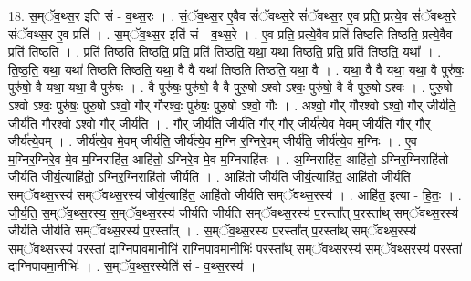 \documentclass[17pt]{extarticle}
\begin{document}
18. स॒म्ॅव॒थ्स॒र इति॑ सं - व॒थ्स॒रः । . सं॒ॅव॒थ्स॒र ए॒वैव सं॑ॅवथ्स॒रे सं॑ॅवथ्स॒र ए॒व प्रति॒ प्रत्ये॒व सं॑ॅवथ्स॒रे सं॑ॅवथ्स॒र ए॒व प्रति॑ । . स॒म्ॅव॒थ्स॒र इति॑ सं - व॒थ्स॒रे । . ए॒व प्रति॒ प्रत्ये॒वैव प्रति॑ तिष्ठति तिष्ठति॒ प्रत्ये॒वैव प्रति॑ तिष्ठति । . प्रति॑ तिष्ठति तिष्ठति॒ प्रति॒ प्रति॑ तिष्ठति॒ यथा॒ यथा॑ तिष्ठति॒ प्रति॒ प्रति॑ तिष्ठति॒ यथा᳚ । . ति॒ष्ठ॒ति॒ यथा॒ यथा॑ तिष्ठति तिष्ठति॒ यथा॒ वै वै यथा॑ तिष्ठति तिष्ठति॒ यथा॒ वै । . यथा॒ वै वै यथा॒ यथा॒ वै पुरु॑षः॒ पुरु॑षो॒ वै यथा॒ यथा॒ वै पुरु॑षः । . वै पुरु॑षः॒ पुरु॑षो॒ वै वै पुरु॒षो ऽश्वो ऽश्वः॒ पुरु॑षो॒ वै वै पुरु॒षो ऽश्वः॑ । . पुरु॒षो ऽश्वो ऽश्वः॒ पुरु॑षः॒ पुरु॒षो ऽश्वो॒ गौर् गौरश्वः॒ पुरु॑षः॒ पुरु॒षो ऽश्वो॒ गौः । . अश्वो॒ गौर् गौरश्वो ऽश्वो॒ गौर् जीर्य॑ति॒ जीर्य॑ति॒ गौरश्वो ऽश्वो॒ गौर् जीर्य॑ति । . गौर् जीर्य॑ति॒ जीर्य॑ति॒ गौर् गौर् जीर्य॑त्ये॒व मे॒वम् जीर्य॑ति॒ गौर् गौर् जीर्य॑त्ये॒वम् । . जीर्य॑त्ये॒व मे॒वम् जीर्य॑ति॒ जीर्य॑त्ये॒व म॒ग्नि र॒ग्निरे॒वम् जीर्य॑ति॒ जीर्य॑त्ये॒व म॒ग्निः । . ए॒व म॒ग्निर॒ग्निरे॒व मे॒व म॒ग्निराहि॑त॒ आहि॑तो॒ ऽग्निरे॒व मे॒व म॒ग्निराहि॑तः । . अ॒ग्निराहि॑त॒ आहि॑तो॒ ऽग्निर॒ग्निराहि॑तो जीर्यति जीर्य॒त्याहि॑तो॒ ऽग्निर॒ग्निराहि॑तो जीर्यति । . आहि॑तो जीर्यति जीर्य॒त्याहि॑त॒ आहि॑तो जीर्यति सम्ॅवथ्स॒रस्य॑ सम्ॅवथ्स॒रस्य॑ जीर्य॒त्याहि॑त॒ आहि॑तो जीर्यति सम्ॅवथ्स॒रस्य॑ । . आहि॑त॒ इत्या - हि॒तः॒ । . जी॒र्य॒ति॒ स॒म्ॅव॒थ्स॒रस्य॒ स॒म्ॅव॒थ्स॒रस्य॑ जीर्यति जीर्यति सम्ॅवथ्स॒रस्य॑ प॒रस्ता᳚त् 
प॒रस्ता᳚थ् सम्ॅवथ्स॒रस्य॑ जीर्यति जीर्यति सम्ॅवथ्स॒रस्य॑ प॒रस्ता᳚त् । . स॒म्ॅव॒थ्स॒रस्य॑ प॒रस्ता᳚त् प॒रस्ता᳚थ् सम्ॅवथ्स॒रस्य॑ सम्ॅवथ्स॒रस्य॑ प॒रस्ता॑ दाग्निपावमा॒नीभि॑ राग्निपावमा॒नीभिः॑ प॒रस्ता᳚थ् सम्ॅवथ्स॒रस्य॑ सम्ॅवथ्स॒रस्य॑ प॒रस्ता॑ दाग्निपावमा॒नीभिः॑ । . स॒म्ॅव॒थ्स॒रस्येति॑ सं - व॒थ्स॒रस्य॑ । \newline
\end{document}
